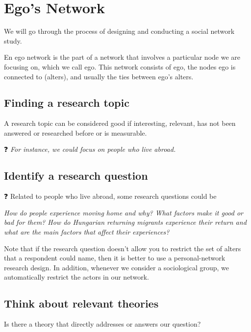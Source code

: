 \documentclass[
  notitlepage,
  onecolumn,
  openany]{book}
\begin{document}
\hypertarget{egos-network}{%
\chapter{Ego's Network}\label{egos-network}}

We will go through the process of designing and conducting a social network study.

En ego network is the part of a network that involves a particular node we are focusing on, which we call ego. This network consists of ego, the nodes ego is connected to (alters), and usually the ties between ego's alters.

\hypertarget{finding-a-research-topic}{%
\section{Finding a research topic}\label{finding-a-research-topic}}

A research topic can be considered good if interesting, relevant, has not been answered or researched before or is measurable.

❓ \emph{For instance, we could focus on people who live abroad.}

\hypertarget{identify-a-research-question}{%
\section{Identify a research question}\label{identify-a-research-question}}

❓ Related to people who live abroad, some research questions could be

\emph{How do people experience moving home and why? What factors make it good or bad for them? How do Hungarian returning migrants experience their return and what are the main factors that affect their experiences?}

Note that if the research question doesn't allow you to restrict the set of alters that a respondent could name, then it is better to use a personal-network research design. In addition, whenever we consider a sociological group, we automatically restrict the actors in our network.

\hypertarget{think-about-relevant-theories}{%
\section{Think about relevant theories}\label{think-about-relevant-theories}}

Is there a theory that directly addresses or answers our question?
\end{document}
